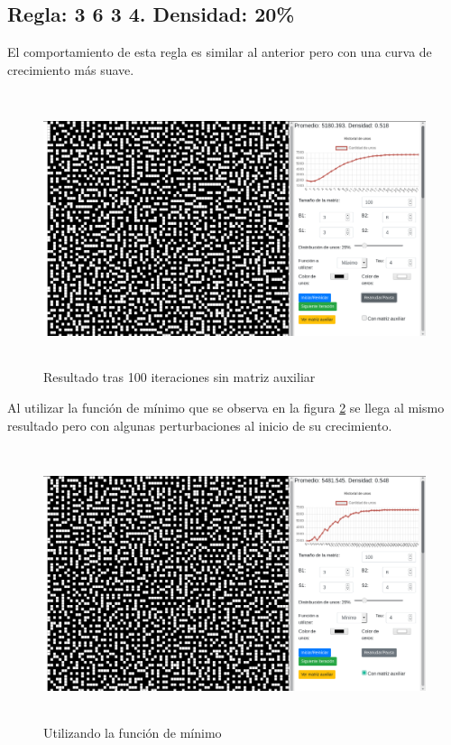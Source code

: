 \documentclass[12pt, titlepage]{article}
\begin{document}
\subsection{Regla: 3 6 3 4. Densidad: 20\%}
El comportamiento de esta regla es similar al anterior pero con una curva de crecimiento más suave.
\begin{figure}[H]
\begin{center}
 \includegraphics[width=15cm, height=8cm]{./img/3634.png}
 \caption{Resultado tras 100 iteraciones sin matriz auxiliar}
 \label{fig:3634}
\end{center}
\end{figure}
Al utilizar la función de mínimo que se observa en la figura \ref{fig:3634-min} se llega al mismo resultado pero con algunas perturbaciones al inicio de su crecimiento.
\begin{figure}[H]
\begin{center}
 \includegraphics[width=15cm, height=8cm]{./img/3634-min.png}
 \caption{Utilizando la función de mínimo}
 \label{fig:3634-min}
\end{center}
\end{figure}
\end{document}
